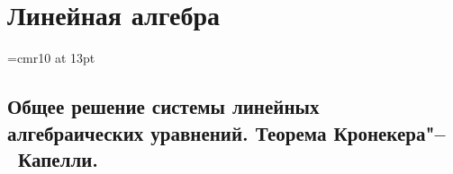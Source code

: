 \part[Линейная алгебра]{Линейная алгебра}%

\font\Large=cmr10 at 13pt
\newcount\rowcount{}
\def\fudge#1{\smash{\hbox{\Large#1}}}
\def\doublyso{\kern+2em\smash{\vrule height \rowcount em depth .2em}\hidewidth}			%
\chapter{Общее решение системы линейных алгебраических уравнений. Теорема Кронекера"--~Капелли.}
